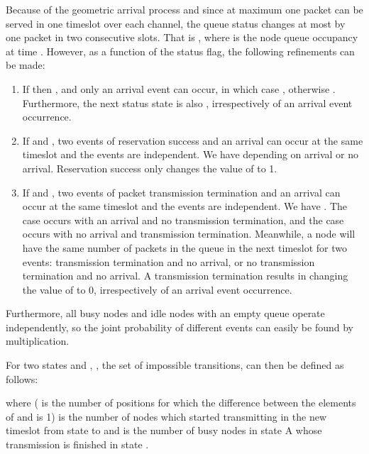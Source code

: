 \documentclass[12pt,journal,oneside,onecolumn]{IEEEtran}
\begin{document}
Because of the geometric arrival process and since at maximum one packet can be served in one timeslot 
over each channel, the queue status changes at most by one packet in two consecutive slots. 
That is , where  is the node  queue occupancy 
at time . However, as a function of the status flag, the following refinements can be made:
\begin{enumerate}
	 \item If  then , and only an arrival event can occur, in which case , 
otherwise . Furthermore, the next status state is also , irrespectively of an arrival event occurrence.
	\item If  and , two events of reservation success and an arrival can 
occur at the same timeslot and the events are independent. We have  
depending on arrival or no arrival. Reservation success only changes the value of  to 1.
	\item If  and , two events of packet transmission termination and an arrival can occur at the same timeslot and the events are independent. We have . 
The case  occurs with an arrival and no transmission termination, and the case  
occurs with no arrival and transmission termination. Meanwhile, a node will have the same number of packets in 
the queue in the next timeslot for two events: transmission termination and no arrival, or no transmission 
termination and no arrival. A transmission termination results in changing the value of  to 0, irrespectively of 
an arrival event occurrence.
\end{enumerate}	
Furthermore, all busy nodes and idle nodes with an empty queue operate independently, 
so the joint probability of different events can easily be found by multiplication.

For two states  and ,
,  the set of impossible transitions, can then be defined as follows: 


\small

\normalsize
where  ( 
is the number of positions for which the difference between the elements of  and  is 1)
is the number of nodes which 
started transmitting in the new timeslot from state  to  and  
is the number of busy nodes in state A whose transmission is finished in state .
\end{document}
